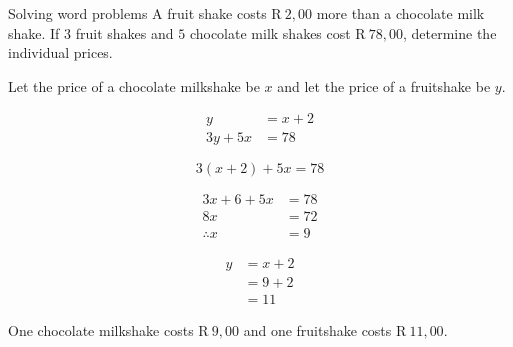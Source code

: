 \begin{wex}
{Solving word problems}
{A fruit shake costs R$~2,00$ more than a chocolate milk shake. If $3$
  fruit shakes and $5$ chocolate milk shakes cost R$~78,00$, determine
  the individual prices.}{
Let the price of a chocolate milkshake be $x$ and let the price of a fruitshake be $y$.

\begin{align*}
  y &= x+2 \\
  3y+5x &= 78
\end{align*}

\begin{equation*}
  3(x+2)+5x = 78
\end{equation*}

\begin{align*}
  3x+6+5x &= 78 \\
  8x &= 72 \\
  \therefore x &= 9
\end{align*}

\begin{align*}
  y &= x+2 \\
  &= 9+2 \\
  &= 11
\end{align*}


One chocolate milkshake costs R$~9,00$ and one fruitshake costs R$~11,00$.
}
\end{wex}

